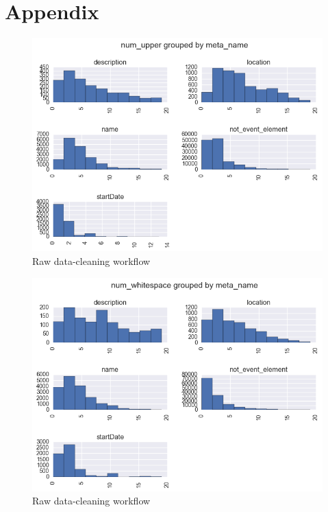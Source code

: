 \chapter*{Appendix}


\begin{figure}[h]
\begin{center}
\includegraphics[width=1.0\textwidth]{figures/distrUpperByMeta}
\caption{Raw data-cleaning workflow}
\label{fig:distrUpperByMeta}
\end{center}
\end{figure}

\begin{figure}[h]
\begin{center}
\includegraphics[width=1.0\textwidth]{figures/distrWhiteByMeta}
\caption{Raw data-cleaning workflow}
\label{fig:distrWhiteByMeta}
\end{center}
\end{figure}

